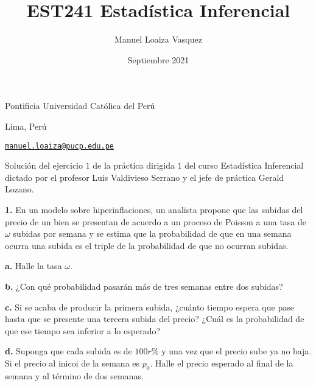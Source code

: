 \documentclass{article}
\title{EST241 Estad\'istica Inferencial}
\author{Manuel Loaiza Vasquez}
\date{Septiembre 2021}
\newenvironment{statement}[1]{\smallskip\noindent\color[rgb]{1.00,0.00,0.50} {\bf #1.}}{}
\theoremstyle{definition}
\theoremstyle{remark}
\begin{document}
\maketitle

\vspace*{-0.25in}
\centerline{Pontificia Universidad Cat\'olica del Per\'u}
\centerline{Lima, Per\'u}
\centerline{\href{mailto:manuel.loaiza@pucp.edu.pe}{{\tt manuel.loaiza@pucp.edu.pe}}}
\vspace*{0.15in}

\begin{framed}
  Soluci\'on del ejercicio $1$ de la pr\'actica dirigida $1$ del curso
  Estad\'istica Inferencial dictado por el profesor Luis Valdivieso Serrano
  y el jefe de pr\'actica Gerald Lozano.
\end{framed}

\begin{statement}{1}
  En un modelo sobre hiperinflaciones, un analista propone que las subidas del
  precio de un bien se presentan de acuerdo a un proceso de Poisson a una tasa
  de $\omega$ subidas por semana y se estima que la probabilidad de que en una semana
  ocurra una subida es el triple de la probabilidad de que no ocurran subidas.
\end{statement}

\begin{statement}{a}
  Halle la tasa $\omega$.
\end{statement}

\begin{statement}{b}
  ¿Con qu\'e probabilidad pasar\'an m\'as de tres semanas entre dos subidas?
\end{statement}

\begin{statement}{c}
  Si se acaba de producir la primera subida,
  ¿cu\'anto tiempo espera que pase hasta que se presente una tercera subida del precio?
  ¿Cu\'al es la probabilidad de que ese tiempo sea inferior a lo esperado?
\end{statement}

\begin{statement}{d}
  Suponga que cada subida es de $100r\%$ y una vez que el precio sube ya no baja.
  Si el precio al inicoi de la semana es $p_0$. Halle el precio esperado al final
  de la semana y al t\'ermino de dos semanas.
\end{statement}
\end{document}
